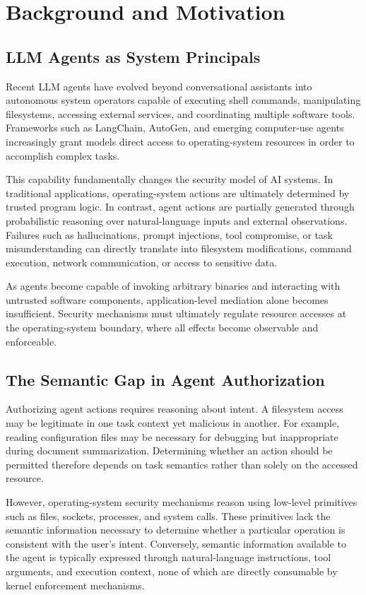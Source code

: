 \section{Background and Motivation}

\subsection{LLM Agents as System Principals}

Recent LLM agents have evolved beyond conversational assistants into autonomous system operators capable of executing shell commands, manipulating filesystems, accessing external services, and coordinating multiple software tools. Frameworks such as LangChain, AutoGen, and emerging computer-use agents increasingly grant models direct access to operating-system resources in order to accomplish complex tasks.

This capability fundamentally changes the security model of AI systems. In traditional applications, operating-system actions are ultimately determined by trusted program logic. In contrast, agent actions are partially generated through probabilistic reasoning over natural-language inputs and external observations. Failures such as hallucinations, prompt injections, tool compromise, or task misunderstanding can directly translate into filesystem modifications, command execution, network communication, or access to sensitive data.

As agents become capable of invoking arbitrary binaries and interacting with untrusted software components, application-level mediation alone becomes insufficient. Security mechanisms must ultimately regulate resource accesses at the operating-system boundary, where all effects become observable and enforceable.

\subsection{The Semantic Gap in Agent Authorization}

Authorizing agent actions requires reasoning about intent. A filesystem access may be legitimate in one task context yet malicious in another. For example, reading configuration files may be necessary for debugging but inappropriate during document summarization. Determining whether an action should be permitted therefore depends on task semantics rather than solely on the accessed resource.

However, operating-system security mechanisms reason using low-level primitives such as files, sockets, processes, and system calls. These primitives lack the semantic information necessary to determine whether a particular operation is consistent with the user's intent. Conversely, semantic information available to the agent is typically expressed through natural-language instructions, tool arguments, and execution context, none of which are directly consumable by kernel enforcement mechanisms.

